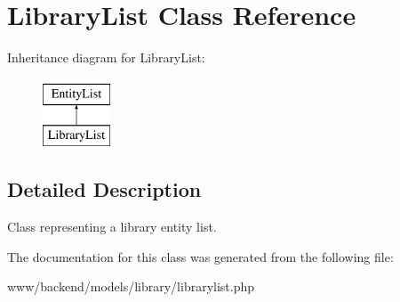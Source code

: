 \hypertarget{classLibraryList}{
\section{LibraryList Class Reference}
\label{classLibraryList}
}
Inheritance diagram for LibraryList:\begin{figure}[H]
\begin{center}
\leavevmode
\includegraphics[height=2.000000cm]{classLibraryList}
\end{center}
\end{figure}


\subsection{Detailed Description}
Class representing a library entity list. 

The documentation for this class was generated from the following file:\begin{DoxyCompactItemize}
\item 
www/backend/models/library/librarylist.php\end{DoxyCompactItemize}
